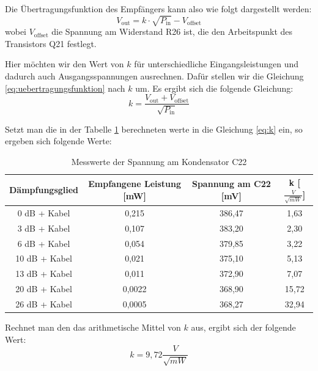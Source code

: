 Die Übertragungsfunktion des Empfängers kann also wie folgt dargestellt werden:
\begin{equation}
    V_\text{out} = k \cdot \sqrt{P_\text{in}} - V_\text{offset}
    \label{eq:uebertragungsfunktion}
\end{equation}
wobei \( V_\text{offset} \) die Spannung am Widerstand R26 ist, die den Arbeitspunkt des Transistors Q21 festlegt. 

Hier möchten wir den Wert von $k$ für unterschiedliche Eingangsleistungen und dadurch auch Ausgangsspannungen ausrechnen. Dafür stellen wir die Gleichung \ref{eq:uebertragungsfunktion} nach $k$ um. Es ergibt sich die folgende Gleichung:
\begin{equation}
    k = \frac{V_\text{out} + V_\text{offset}}{\sqrt{P_\text{in}}}
    \label{eq:k}
\end{equation}

Setzt man die in der Tabelle \ref{tab:spannung} berechneten werte in die Gleichung \ref{eq:k} ein, so ergeben sich folgende Werte:

\begin{table}[H]
    \centering
    \begin{tabular}{|c|c|c|c|}
        \hline
        Dämpfungsglied  & Empfangene Leistung [mW] & Spannung am C22 [mV] & k [$\frac{V}{\sqrt{mW}}$] \\ \hline
        0 dB + Kabel   & 0,215 & 386,47 & 1,63\\ \hline
        3 dB + Kabel   & 0,107 & 383,20 & 2,30\\ \hline
        6 dB + Kabel   & 0,054 & 379,85 & 3,22\\ \hline
        10 dB + Kabel  & 0,021 & 375,10 & 5,13\\ \hline
        13 dB + Kabel  & 0,011 & 372,90 & 7,07\\ \hline
        20 dB + Kabel  & 0,0022 & 368,90 & 15,72\\ \hline
        26 dB + Kabel  & 0,0005 & 368,27 & 32,94\\ \hline
    \end{tabular}
    \caption{Messwerte der Spannung am Kondensator C22}
    \label{tab:spannung}
\end{table}

Rechnet man den das arithmetische Mittel von $k$ aus, ergibt sich der folgende Wert:
\begin{equation}
    k = 9,72 \frac{V}{\sqrt{mW}}
\end{equation}
